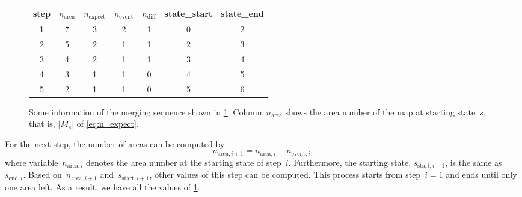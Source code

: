 \documentclass[ijgi,article,submit,moreauthors,pdftex]{Definitions/mdpi}
\begin{document}
\begin{figure}[tb]
%
%
%
\captionsetup*{type=table} %
\caption{Some information of the merging sequence shown in \tbl\ref{tbl:sequence_greedy}.
Column~$n_\mathrm{area}$ shows the area number of the map at starting state~$s$,
that is, $|M_s|$ of \eq\ref{eq:n_expect}.
}
\label{tbl:sequence_greedy}
\centering
\begin{tabular}{ccccccc}
	\hline
	step & $n_\mathrm{area}$ & $n_\mathrm{expect}$ 
	& $n_\mathrm{event}$ & $n_\mathrm{diff}$ & state\_start & state\_end \\ \hline
	1        & 7      & 3        & 2        & 1     & 0      & 2      \\
	2        & 5      & 2        & 1        & 1     & 2      & 3      \\
	3        & 4      & 2        & 1        & 1     & 3      & 4      \\
	4        & 3      & 1        & 1        & 0     & 4      & 5      \\
	5        & 2      & 1        & 1        & 0     & 5      & 6      \\ \hline
\end{tabular}
\end{figure}

For the next step, the number of areas can be computed by
$$
n_{\mathrm{area},i+1} = n_{\mathrm{area},i} - n_{\mathrm{event},i},
$$
where variable~$n_{\mathrm{area},i}$ denotes the area number 
at the starting state of step~$i$.
Furthermore, the starting state, $s_{\mathrm{start},i+1}$, is the same as  
$s_{\mathrm{end},i}$.
Based on~$n_{\mathrm{area},i+1}$ and~$s_{\mathrm{start},i+1}$,
other values of this step can be computed.
This process starts from step~$i=1$ and ends until only one area left.
As a result, we have all the values of \tbl\ref{tbl:sequence_greedy}.


\end{document}
